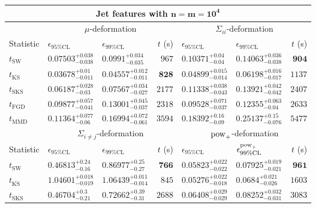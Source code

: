 \begin{tabular}{l|llr|llr}
	\toprule
	\multicolumn{7}{c}{{\bf Jet features with $\mathbf{n=m=10^{4}}$}} \\
	\toprule
	\multicolumn{1}{c}{} & \multicolumn{3}{c}{$\mu$-deformation} & \multicolumn{3}{c}{$\Sigma_{ii}$-deformation} \\
	Statistic & $\epsilon_{95\%\mathrm{CL}}$ & $\epsilon_{99\%\mathrm    {CL}}$ & $t$ (s) & $\epsilon_{95\%\mathrm{CL}}$ & $\epsilon_{99\%\mathrm{CL}}$ & $t$ (s) \\
	\midrule
	$t_{\mathrm{SW}}$ & $0.07503_{-0.038}^{+0.038}$ & $0.0991_{-0.035}^{+0.034}$ & $967$ & $0.10371_{-0.04}^{+0.04}$ & $0.14063_{-0.038}^{+0.036}$ & ${\mathbf{904}}$ \\
	$t_{\overline{\mathrm{KS}}}$ & ${\mathbf{0.03678_{-0.011}^{+0.01}}}$ & ${\mathbf{0.04557_{-0.011}^{+0.012}}}$ & ${\mathbf{828}}$ & ${\mathbf{0.04899_{-0.014}^{+0.015}}}$ & ${\mathbf{0.06198_{-0.017}^{+0.016}}}$ & $1137$ \\
	$t_{\mathrm{SKS}}$ & $0.06187_{-0.03}^{+0.028}$ & $0.07567_{-0.027}^{+0.034}$ & $2177$ & $0.11338_{-0.043}^{+0.038}$ & $0.13921_{-0.042}^{+0.042}$ & $2407$ \\
	$t_{\mathrm{FGD}}$ & $0.09877_{-0.041}^{+0.057}$ & $0.13001_{-0.037}^{+0.045}$ & $2318$ & $0.09528_{-0.037}^{+0.071}$ & $0.12355_{-0.04}^{+0.063}$ & $2633$ \\
	$t_{\mathrm{MMD}}$ & $0.11364_{-0.06}^{+0.077}$ & $0.16994_{-0.061}^{+0.072}$ & $3594$ & $0.18392_{-0.09}^{+0.16}$ & $0.25137_{-0.076}^{+0.15}$ & $5477$ \\
	\toprule
	\multicolumn{1}{c}{} & \multicolumn{3}{c}{$\Sigma_{i\neq j}$-deformation} & \multicolumn{3}{c}{$\rm{pow}_{+}$-deformation} \\
	Statistic & $\epsilon_{95\%\mathrm{CL}}$ & $\epsilon_{99\%\mathrm{CL}}$ & $t$ (s) & $\epsilon_{95\%\mathrm{CL}}$ & $\epsilon^{\rm   {pow}_{+}}_{99\%\mathrm{CL}}$ & $t$ (s) \\
	\midrule
	$t_{\mathrm{SW}}$ & $0.46813_{-0.16}^{+0.24}$ & $0.86977_{-0.27}^{+0.25}$ & ${\mathbf{766}}$ & $0.05823_{-0.022}^{+0.022}$ & $0.07925_{-0.021}^{+0.019}$ & ${\mathbf{961}}$ \\
	$t_{\overline{\mathrm{KS}}}$ & $1.04601_{-0.019}^{+0.018}$ & $1.06439_{-0.014}^{+0.011}$ & $845$ & ${\mathbf{0.05276_{-0.018}^{+0.022}}}$ & $0.0684_{-0.026}^{+0.021}$ & $1603$ \\
	$t_{\mathrm{SKS}}$ & $0.46704_{-0.21}^{+0.3}$ & $0.72662_{-0.31}^{+0.39}$ & $2688$ & $0.06408_{-0.029}^{+0.029}$ & $0.08252_{-0.031}^{+0.032}$ & $3083$ \\

\end{tabular}
